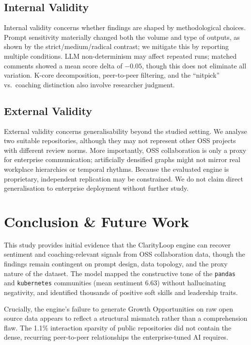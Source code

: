 \documentclass[a4paper,UKenglish,cleveref,autoref]{lipics-v2021}
\begin{document}
\subsection{Internal Validity}
Internal validity concerns whether findings are shaped by methodological choices. Prompt sensitivity materially changed both the volume and type of outputs, as shown by the strict/medium/radical contrast; we mitigate this by reporting multiple conditions. LLM non-determinism may affect repeated runs; matched comments showed a mean score delta of $-0.05$, though this does not eliminate all variation. K-core decomposition, peer-to-peer filtering, and the ``nitpick'' vs.\ coaching distinction also involve researcher judgment.

\subsection{External Validity}
External validity concerns generalisability beyond the studied setting. We analyse two suitable repositories, although they may not represent other OSS projects with different review norms. More importantly, OSS collaboration is only a proxy for enterprise communication; artificially densified graphs might not mirror real workplace hierarchies or temporal rhythms. Because the evaluated engine is proprietary, independent replication may be constrained. We do not claim direct generalisation to enterprise deployment without further study.

\section{Conclusion \& Future Work}
This study provides initial evidence that the ClarityLoop engine can recover sentiment and coaching-relevant signals from OSS collaboration data, though the findings remain contingent on prompt design, data topology, and the proxy nature of the dataset. The model mapped the constructive tone of the \texttt{pandas} and \texttt{kubernetes} communities (mean sentiment 6.63) without hallucinating negativity, and identified thousands of positive soft skills and leadership traits.

Crucially, the engine's failure to generate Growth Opportunities on raw open source data appears to reflect a structural mismatch rather than a comprehension flaw. The 1.1\% interaction sparsity of public repositories did not contain the dense, recurring peer-to-peer relationships the enterprise-tuned AI requires.
\end{document}
